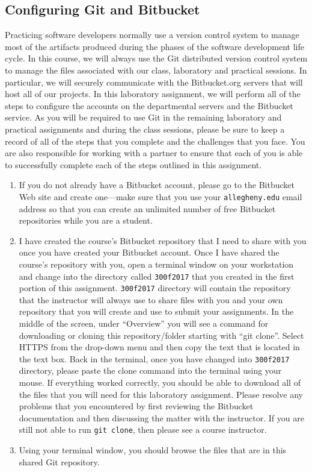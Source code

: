 \subsection*{Configuring Git and Bitbucket}
\vspace*{-.1in}
Practicing software developers normally use a version control system to manage most of the artifacts produced during the phases of the software development life cycle.  In this course, we will always use the Git distributed version control system to manage the files associated with our class, laboratory and practical sessions.  In particular, we will securely communicate with the Bitbucket.org servers that will host all of our projects.  In this laboratory assignment, we will perform all of the steps to configure the accounts on the departmental servers and the Bitbucket service.  As you will be required to use Git in the remaining laboratory and practical assignments and during the class sessions, please be sure to keep a record of all of the steps that you complete and the challenges that you face.  You are also
responsible for working with a partner to ensure that each of you is able to successfully complete each of the steps outlined in this assignment.

\begin{enumerate}

  \item If you do not already have a Bitbucket account, please go to the Bitbucket Web site and create one---make sure that you use your {\tt allegheny.edu} email address so that you can create an unlimited number of free Bitbucket repositories while you are a student. 

  \item I have created the course's Bitbucket repository that I need to share with you once you have created your Bitbucket account. Once I have shared the course's repository with you, open a terminal window on your workstation and change into the directory  called {\tt 300f2017}  that you created in the first portion of this assignment. {\tt 300f2017} directory will contain the repository that the instructor will always use to share files with you and your own repository that you will create and use to submit your assignments.  In the middle of the screen, under ``Overview'' you will see a command for downloading or cloning this repository/folder starting with ``git clone''.  Select HTTPS from the drop-down menu and then copy the text that is located in the text box. Back in the terminal, once you have changed into {\tt 300f2017} directory, please paste the clone command into the terminal using your mouse. If everything worked correctly, you should be able to download all of the files that you will need for this laboratory assignment. Please resolve any problems that you encountered by first reviewing the Bitbucket documentation and then discussing the matter with the instructor.  If you are still not able to run {\tt git clone}, then please see a course instructor.
      
  \item Using your terminal window, you should browse the files that are in this shared Git repository. 
  
\end{enumerate}


